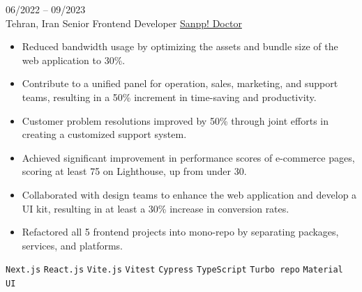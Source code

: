 \entry
{06/2022 -- 09/2023 \\ Tehran, Iran}
{Senior Frontend Developer}
{\href{https://snapp.doctor/}{Sanpp! Doctor}}
{\vspace{-10pt}
    \begin{itemize}[noitemsep,topsep=0pt,parsep=0pt,partopsep=0pt, leftmargin=-1pt]
        \item Reduced bandwidth usage by optimizing the assets and bundle size of the web application to 30\%.
        \item Contribute to a unified panel for operation, sales, marketing, and support teams, resulting in a 50\% increment in time-saving and productivity.
        \item Customer problem resolutions improved by 50\% through joint efforts in creating a customized support system.
        \item Achieved significant improvement in performance scores of e-commerce pages, scoring at least 75 on Lighthouse, up from under 30.
        \item Collaborated with design teams to enhance the web application and develop a UI kit, resulting in at least a 30\% increase in conversion rates.
        \item Refactored all 5 frontend projects into mono-repo by separating packages, services, and platforms.
    \end{itemize}
    \texttt{Next.js} \slashsep \texttt{React.js} \slashsep \texttt{Vite.js} \slashsep \texttt{Vitest} \slashsep \texttt{Cypress} \slashsep \texttt{TypeScript} \slashsep \texttt{Turbo repo} \slashsep \texttt{Material UI}
}
